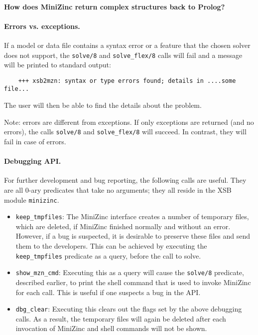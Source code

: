 \paragraph{How does MiniZinc return complex structures back to Prolog?}

\paragraph{Errors vs. exceptions.}
If a model or data file contains a syntax error or a feature that the
chosen solver does not support, the \texttt{solve/8} and
\texttt{solve\_flex/8} calls will fail and a message will be printed to
standard output:
\begin{verbatim}
    +++ xsb2mzn: syntax or type errors found; details in ....some file...
\end{verbatim}
The user will then be able to find the details about the problem.

Note: errors are different from exceptions. If only exceptions are returned
(and no errors), the calls \texttt{solve/8} and \texttt{solve\_flex/8} will
succeed. In contrast, they will fail in case of errors.

\paragraph{Debugging API.}
For further development and bug reporting, the following calls are useful.
They are all 0-ary predicates that take no arguments; they all reside in the
XSB module \texttt{minizinc}. 
\begin{itemize}
\item  \texttt{keep\_tmpfiles}: The MiniZinc interface creates a number of
  temporary files, which are deleted, if MiniZinc finished normally and
  without an error. However, if a bug is suspected, it is desirable to
  preserve these files and send them to the developers. 
  This can be achieved by executing the \texttt{keep\_tmpfiles} predicate
  as a query, before the call to solve.
\item \texttt{show\_mzn\_cmd}: Executing this as a query will cause the
  \texttt{solve/8} predicate, described earlier, to print the shell command
  that is used to invoke MiniZinc for each call.
  This is useful if one suspects a bug in the API.
\item \texttt{dbg\_clear}: Executing this clears out the flags set by the
  above debugging calls. As a result, the temporary files will again be
  deleted after each invocation of MiniZinc and shell commands will not be
  shown.
\end{itemize}



